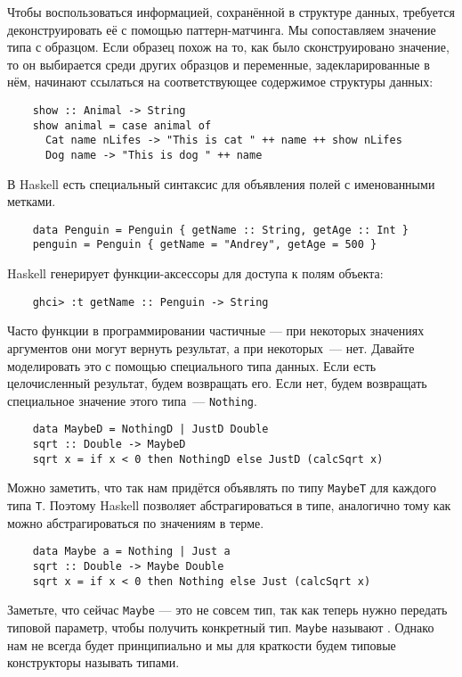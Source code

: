Чтобы воспользоваться информацией, сохранённой в структуре данных, требуется деконструировать её с помощью паттерн-матчинга.
Мы сопоставляем значение типа с образцом.
Если образец похож на то, как было сконструировано значение, то он выбирается среди других образцов и переменные, задекларированные в нём, начинают ссылаться на соответствующее содержимое структуры данных:
\begin{verbatim}
    show :: Animal -> String
    show animal = case animal of
      Cat name nLifes -> "This is cat " ++ name ++ show nLifes
      Dog name -> "This is dog " ++ name
\end{verbatim}

В Haskell есть специальный синтаксис для объявления полей с именованными метками.
\begin{verbatim}
    data Penguin = Penguin { getName :: String, getAge :: Int }
    penguin = Penguin { getName = "Andrey", getAge = 500 }
\end{verbatim}
Haskell генерирует функции-аксессоры для доступа к полям объекта:
\begin{verbatim}
    ghci> :t getName :: Penguin -> String
\end{verbatim}

Часто функции в программировании частичные --- при некоторых значениях аргументов они могут вернуть результат, а при некоторых~--- нет.
Давайте моделировать это с помощью специального типа данных.
Если есть целочисленный результат, будем возвращать его.
Если нет, будем возвращать специальное значение этого типа~--- \texttt{Nothing}.
\begin{verbatim}
    data MaybeD = NothingD | JustD Double
    sqrt :: Double -> MaybeD
    sqrt x = if x < 0 then NothingD else JustD (calcSqrt x)
\end{verbatim}

Можно заметить, что так нам придётся объявлять по типу \texttt{MaybeT} для каждого типа \texttt{T}.
Поэтому Haskell позволяет абстрагироваться в типе, аналогично тому как можно абстрагироваться по значениям в терме.
\begin{verbatim}
    data Maybe a = Nothing | Just a
    sqrt :: Double -> Maybe Double
    sqrt x = if x < 0 then Nothing else Just (calcSqrt x)
\end{verbatim}

Заметьте, что сейчас \texttt{Maybe} --- это не совсем тип, так как теперь нужно передать типовой параметр, чтобы получить конкретный тип.
\texttt{Maybe} называют .
Однако нам не всегда будет принципиально и мы для краткости будем типовые конструкторы называть типами.


